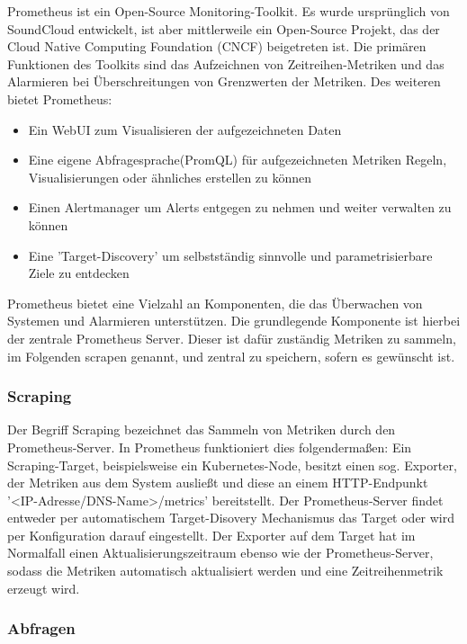 \documentclass[a4paper,10pt]{scrartcl}
\begin{document}
Prometheus ist ein Open-Source Monitoring-Toolkit. Es wurde ursprünglich von SoundCloud entwickelt, ist aber mittlerweile ein Open-Source Projekt, das der Cloud Native
Computing Foundation (CNCF) beigetreten ist. Die primären Funktionen des Toolkits
sind das Aufzeichnen von Zeitreihen-Metriken und das Alarmieren bei Überschreitungen
von Grenzwerten der Metriken. Des weiteren bietet Prometheus:\\

\begin{itemize}
\item Ein WebUI zum Visualisieren der aufgezeichneten Daten
\item Eine eigene Abfragesprache(PromQL) für aufgezeichneten Metriken Regeln, Visualisierungen oder ähnliches erstellen zu können
\item Einen Alertmanager um Alerts entgegen zu nehmen und weiter verwalten zu können
\item Eine 'Target-Discovery' um selbstständig sinnvolle und parametrisierbare Ziele zu entdecken

\end{itemize}

Prometheus bietet eine Vielzahl an Komponenten, die das Überwachen von Systemen und Alarmieren unterstützen. Die grundlegende Komponente ist hierbei der zentrale Prometheus Server. Dieser ist dafür zuständig Metriken zu sammeln, im Folgenden scrapen genannt, und zentral zu speichern, sofern es gewünscht ist.

\subsubsection{Scraping}

Der Begriff Scraping bezeichnet das Sammeln von Metriken durch den Prometheus-Server. In Prometheus funktioniert dies folgendermaßen:
Ein Scraping-Target, beispielsweise ein Kubernetes-Node, besitzt einen sog. Exporter, der Metriken aus dem System ausließt und diese an einem HTTP-Endpunkt '<IP-Adresse/DNS-Name>/metrics' bereitstellt. Der Prometheus-Server findet entweder per automatischem Target-Disovery Mechanismus das Target oder wird per Konfiguration darauf eingestellt.
Der Exporter auf dem Target hat im Normalfall einen Aktualisierungszeitraum ebenso wie der Prometheus-Server, sodass die Metriken automatisch aktualisiert werden und eine Zeitreihenmetrik erzeugt wird.

\subsubsection{Abfragen}
\end{document}
